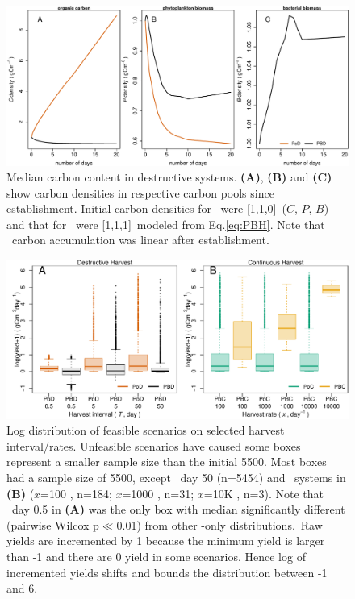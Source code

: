 \documentclass[../thesis.tex]{subfiles} %
\begin{document}
\begin{figure}[H]
    \centering
    \includegraphics[width=\linewidth]{result/Sample.pdf}
    \caption[Median carbon content in destructive systems]{Median carbon content in destructive systems.  \textbf{(A)}, \textbf{(B)} and \textbf{(C)} show carbon densities in respective carbon pools since establishment.  Initial carbon densities for \PoN\ were [1,1,0]\den\ ($C$, $P$, $B$) and that for \PBN\ were [1,1,1]\den\ modeled from Eq.\ref{eq:PBH}.  Note that \PoN\ carbon accumulation was linear after establishment.}
    \label{f:destCarbon}
\end{figure}

\begin{figure}[H]
    \centering
    \includegraphics[width=\linewidth]{result/Harvest.pdf}
    \caption[Yield flux distribution by harvest mode]{Log distribution of feasible scenarios on selected harvest interval/rates.  Unfeasible scenarios have caused some boxes represent a smaller sample size than the initial 5500.  Most boxes had a sample size of 5500, except \PBN\ day 50 (n=5454) and \PBH\ systems in \textbf{(B)} ($x$=100 \dayU, n=184; $x$=1000 \dayU, n=31; $x$=10K \dayU, n=3).  Note that \PoN\ day 0.5 in \textbf{(A)} was the only box with median significantly different (pairwise Wilcox p$\ll$0.01) from other \phy-only distributions.\pAExplain\  Raw yields are incremented by 1 because the minimum yield is larger than -1 and there are 0 yield in some scenarios.  Hence log of incremented yields shifts and bounds the distribution between -1 and 6.}
    \label{f:ydByHarv}
\end{figure}
\end{document}

